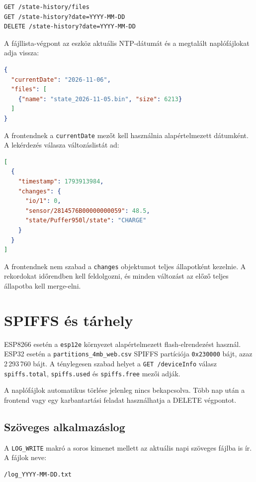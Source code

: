 \documentclass[11pt,a4paper]{article}
\begin{document}
\begin{lstlisting}
GET /state-history/files
GET /state-history?date=YYYY-MM-DD
DELETE /state-history?date=YYYY-MM-DD
\end{lstlisting}

A fájllista-végpont az eszköz aktuális NTP-dátumát és a megtalált naplófájlokat adja vissza:

\begin{lstlisting}[language=json]
{
  "currentDate": "2026-11-06",
  "files": [
    {"name": "state_2026-11-05.bin", "size": 6213}
  ]
}
\end{lstlisting}

A frontendnek a \texttt{currentDate} mezőt kell használnia alapértelmezett dátumként. A lekérdezés válasza változáslistát ad:

\begin{lstlisting}[language=json]
[
  {
    "timestamp": 1793913984,
    "changes": {
      "io/1": 0,
      "sensor/2814576B00000000059": 48.5,
      "state/Puffer950l/state": "CHARGE"
    }
  }
]
\end{lstlisting}

A frontendnek nem szabad a \texttt{changes} objektumot teljes állapotként kezelnie. A rekordokat időrendben kell feldolgozni, és minden változást az előző teljes állapotba kell merge-elni.

\section{SPIFFS és tárhely}

ESP8266 esetén a \texttt{esp12e} környezet alapértelmezett flash-elrendezést használ. ESP32 esetén a \texttt{partitions\_4mb\_web.csv} SPIFFS partíciója \texttt{0x230000} bájt, azaz 2\,293\,760 bájt. A ténylegesen szabad helyet a \texttt{GET /deviceInfo} válasz \texttt{spiffs.total}, \texttt{spiffs.used} és \texttt{spiffs.free} mezői adják.

A naplófájlok automatikus törlése jelenleg nincs bekapcsolva. Több nap után a frontend vagy egy karbantartási feladat használhatja a DELETE végpontot.

\subsection{Szöveges alkalmazáslog}

A \texttt{LOG\_WRITE} makró a soros kimenet mellett az aktuális napi szöveges fájlba is ír. A fájlok neve:

\begin{lstlisting}
/log_YYYY-MM-DD.txt
\end{lstlisting}
\end{document}
